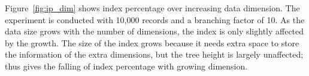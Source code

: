 Figure~\ref{fig:ip_dim} shows index percentage over increasing
data dimension. The experiment is conducted with 10,000 records
and a branching factor of 10. As the data size grows with the
number of dimensions, the index is only slightly affected by the
growth. The size of the index grows because it needs extra space
to store the information of the extra dimensions, but the tree
height is largely unaffected; thus gives the falling of index
percentage with growing dimension.


